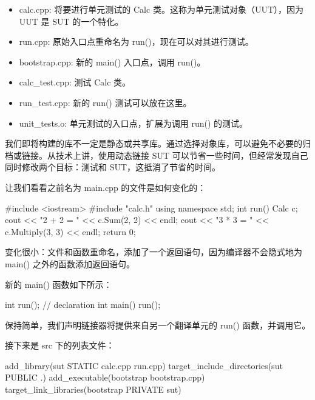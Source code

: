 \begin{itemize}
\item
calc.cpp: 将要进行单元测试的 Calc 类。这称为单元测试对象（UUT），因为 UUT 是 SUT 的一个特化。

\item
run.cpp: 原始入口点重命名为 run()，现在可以对其进行测试。

\item
bootstrap.cpp: 新的 main() 入口点，调用 run()。

\item
calc\_test.cpp: 测试 Calc 类。

\item
run\_test.cpp: 新的 run() 测试可以放在这里。

\item
unit\_tests.o: 单元测试的入口点，扩展为调用 run() 的测试。
\end{itemize}

我们即将构建的库不一定是静态或共享库。通过选择对象库，可以避免不必要的归档或链接。从技术上讲，使用动态链接 SUT 可以节省一些时间，但经常发现自己同时修改两个目标：测试和 SUT，这抵消了节省的时间。

让我们看看之前名为 main.cpp 的文件是如何变化的：


\begin{cpp}
#include <iostream>
#include "calc.h"
using namespace std;
int run() {
    Calc c;
    cout << "2 + 2 = " << c.Sum(2, 2) << endl;
    cout << "3 * 3 = " << c.Multiply(3, 3) << endl;
    return 0;
}
\end{cpp}

变化很小：文件和函数重命名，添加了一个返回语句，因为编译器不会隐式地为 main() 之外的函数添加返回语句。

新的 main() 函数如下所示：


\begin{cpp}
int run(); // declaration
int main() {
    run();
}
\end{cpp}

保持简单，我们声明链接器将提供来自另一个翻译单元的 run() 函数，并调用它。

接下来是 src 下的列表文件：


\begin{cmake}
add_library(sut STATIC calc.cpp run.cpp)
target_include_directories(sut PUBLIC .)
add_executable(bootstrap bootstrap.cpp)
target_link_libraries(bootstrap PRIVATE sut)
\end{cmake}

